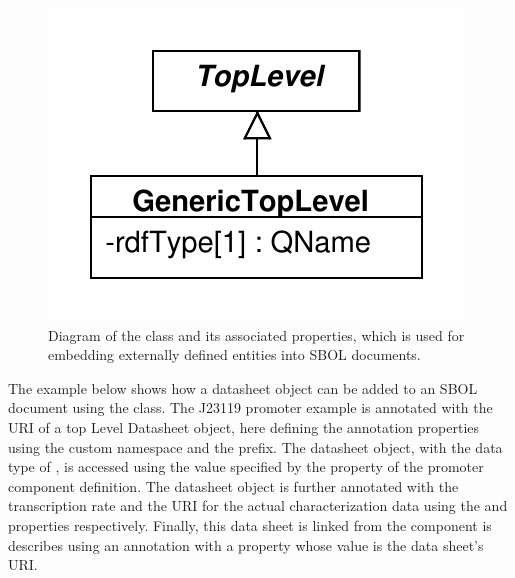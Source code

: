 \begin{figure}[ht]
\begin{center}
\includegraphics[scale=0.6]{uml/generictoplevel}
\caption[]{Diagram of the  class and its associated properties, which is used for embedding externally defined entities into SBOL documents.}
\label{uml:generictoplevel}
\end{center}
\end{figure}

The example below shows how a datasheet object can be added to an SBOL document using the  class. 
The J23119 promoter example is annotated with the URI of a top Level Datasheet object, here defining the annotation properties using the custom  namespace and the  prefix. 
The datasheet object, with the data type of , is accessed using the  value specified by the  property of the promoter component definition. 
The datasheet object is further annotated with the transcription rate and the URI for the actual characterization data using the  and  properties respectively.
Finally, this data sheet is linked from the component is describes using an annotation with a  property whose value is the data sheet's URI.

